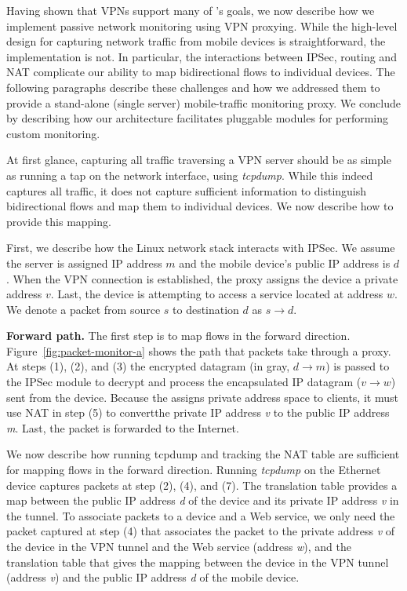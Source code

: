 Having shown that VPNs support many of \platname{}'s goals, 
we now describe how we implement passive network monitoring 
using VPN proxying. While the high-level design for capturing 
network traffic from mobile devices is straightforward, the implementation 
is not. In particular, the interactions between IPSec, routing and NAT 
complicate our ability to map bidirectional flows to individual devices. 
The following paragraphs describe these challenges and how we 
addressed them to provide a stand-alone (\ie single server) mobile-traffic monitoring 
proxy. We conclude by describing how our architecture facilitates 
pluggable modules for performing custom monitoring.

At first glance, capturing all traffic traversing a VPN server should be 
as simple as running a tap on the network interface, \eg using \textit{tcpdump}. 
While this indeed captures all traffic, it does not capture sufficient information 
to distinguish bidirectional flows and map them to individual devices. We now 
describe how to provide this mapping.

First, we describe how the Linux network stack interacts with IPSec. 
We assume the \platname{} server is assigned 
IP address $m$ and the mobile device's public IP address is $d$. When 
the VPN connection is established, the proxy assigns the device a private address 
$v$. Last, the device is attempting to access a service located at address $w$. 
We denote a packet from source $s$ to destination $d$ as $s \rightarrow d$.

\noindent \textbf{Forward path.} The first step is to map flows in the forward direction. Figure~\ref{fig:packet-monitor-a} shows the path that packets take 
through a \platname{} proxy.  At steps (1),
(2), and (3) the encrypted datagram (in gray, $d \rightarrow m$) is passed to the IPSec 
module to decrypt and process the encapsulated IP datagram ($v \rightarrow w$) sent from 
the device. Because the \platname{} assigns private address space to 
clients, it must use NAT in step (5) to convertthe private IP address \emph{v} to the public IP
address \emph{m}. Last, the packet is forwarded to the Internet. 

We now describe how running tcpdump and tracking the NAT table are 
sufficient for mapping flows in the forward direction. Running \emph{tcpdump} on the Ethernet device captures packets at 
step (2), (4), and (7). The translation table provides a map between the public IP address \emph{d}
of the device and its private IP address \emph{v} in the tunnel. To
associate packets to a device and a Web service, we only need the
packet captured at step (4) that associates the packet to the private
address \emph{v} of the device in the VPN tunnel and the Web service
(address \emph{w}), and the translation table that gives the
mapping between the device in the VPN tunnel (address \emph{v}) and
the public IP address \emph{d} of the mobile device.


